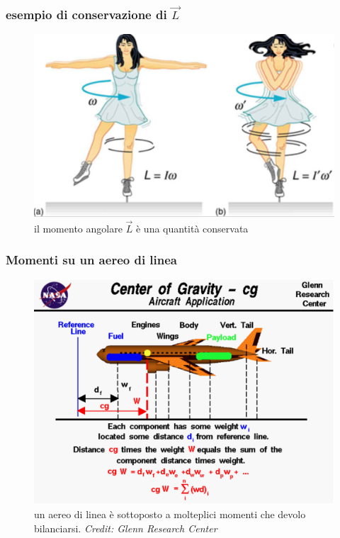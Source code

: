 \documentclass{beamer}
\begin{document}
\begin{frame}
\frametitle{esempio di conservazione di $\vec{L}$}
\begin{figure}
\includegraphics[scale=0.33]{./images/dancer}
\caption{il momento angolare $\vec{L}$ è una quantità conservata}
\end{figure}
\end{frame}

\begin{frame}
\frametitle{Momenti su un aereo di linea}
\begin{figure}
\includegraphics[scale=0.33]{./images/complexmab}
\caption{un aereo di linea è sottoposto a molteplici momenti che devolo bilanciarsi. \textit{Credit: Glenn Research Center}}
\end{figure}
\end{frame}
\end{document}

